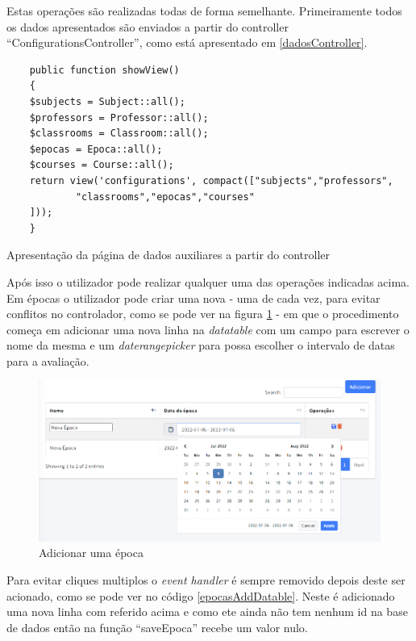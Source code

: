\documentclass[12pt, twoside]{report}
\begin{document}
	Estas operações são realizadas todas de forma semelhante. Primeiramente todos os dados apresentados são enviados a partir do controller ``ConfigurationsController'', como está apresentado em \ref{dadosController}. 
	
	\begin{listing}[H]
	\begin{verbatim}
	public function showView()
	{
	$subjects = Subject::all();
	$professors = Professor::all();
	$classrooms = Classroom::all();
	$epocas = Epoca::all();
	$courses = Course::all();
	return view('configurations', compact(["subjects","professors",
			"classrooms","epocas","courses"
	]));
	}
	\end{verbatim}
	\caption{Apresentação da página de dados auxiliares a partir do controller}
	\label{dadosController}
	\end{listing}
	  
	Após isso o utilizador pode realizar qualquer uma das operações indicadas acima. Em épocas o utilizador pode criar uma nova - uma de cada vez, para evitar conflitos no controlador, como se pode ver na figura \ref{epocasAdd} - em que o procedimento começa em adicionar uma nova linha na \textit{datatable} com um campo para escrever o nome da mesma e um \textit{daterangepicker} para possa escolher o intervalo de datas para a avaliação. 
	
	\begin{figure}[H] 
		
		\centering 			
		\includegraphics[width=1\textwidth,height=1\textheight,keepaspectratio]{image/epocasAdd}
		\caption{Adicionar uma época}
		\label{epocasAdd}
		
	\end{figure} 

	Para evitar cliques multiplos o \textit{event handler} é sempre removido depois deste ser acionado, como se pode ver no código \ref{epocasAddDatable}. Neste é adicionado uma nova linha com referido acima e como ete ainda não tem nenhum id na base de dados então na função ``saveEpoca'' recebe um valor nulo.
	
\end{document}
